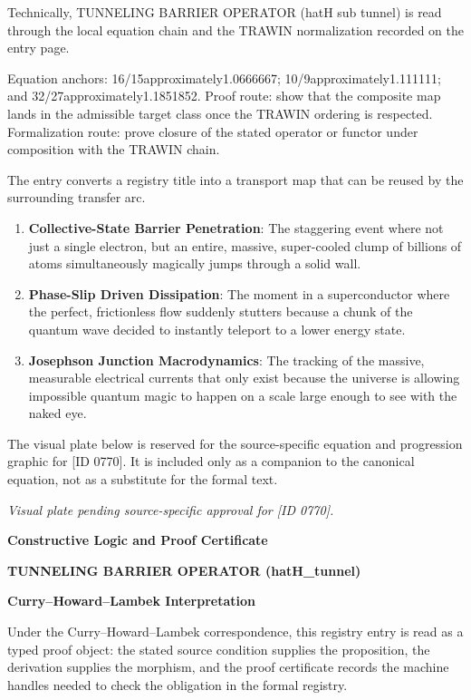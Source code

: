 Technically, TUNNELING BARRIER OPERATOR (hatH sub tunnel) is read through the local equation chain and the TRAWIN normalization recorded on the entry page.

Equation anchors: 16/15approximately1.0666667; 10/9approximately1.111111; and 32/27approximately1.1851852. Proof route: show that the composite map lands in the admissible target class once the TRAWIN ordering is respected. Formalization route: prove closure of the stated operator or functor under composition with the TRAWIN chain.

The entry converts a registry title into a transport map that can be reused by the surrounding transfer arc.
\endgroup

\begin{enumerate}[leftmargin=1.6em,itemsep=6pt,topsep=4pt]
\item \textbf{Collective-State Barrier Penetration}: The staggering event where not just a single electron, but an entire, massive, super-cooled clump of billions of atoms simultaneously magically jumps through a solid wall.
\item \textbf{Phase-Slip Driven Dissipation}: The moment in a superconductor where the perfect, frictionless flow suddenly stutters because a chunk of the quantum wave decided to instantly teleport to a lower energy state.
\item \textbf{Josephson Junction Macrodynamics}: The tracking of the massive, measurable electrical currents that only exist because the universe is allowing impossible quantum magic to happen on a scale large enough to see with the naked eye.
\end{enumerate}

\begingroup\footnotesize\sloppy
The visual plate below is reserved for the source-specific equation and progression graphic for [ID 0770]. It is included only as a companion to the canonical equation, not as a substitute for the formal text.
\par\endgroup
\begingroup\footnotesize\itshape
Visual plate pending source-specific approval for [ID 0770].
\par\endgroup

\clearpage
\begingroup\tzpsupportsetup
\noindent\textbf{\fontsize{10.8pt}{12.8pt}\selectfont [ID 0770] Constructive Logic and Proof Certificate}\par
\noindent\textbf{\fontsize{10pt}{12pt}\selectfont TUNNELING BARRIER OPERATOR (hatH\_tunnel)}\par
\vspace{0.45em}
\begingroup
\footnotesize
\setlength{\parskip}{0.22em}
\setlength{\parindent}{0pt}
\noindent\textbf{Curry--Howard--Lambek Interpretation}\par
Under the Curry--Howard--Lambek correspondence, this registry entry is read as a typed proof
object: the stated source condition supplies the proposition, the derivation supplies the
morphism, and the proof certificate records the machine handles needed to check the obligation
in the formal registry.

